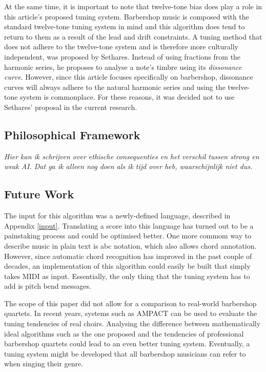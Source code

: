 \documentclass[a4paper]{article}
\begin{document}
At the same time, it is important to note that twelve-tone bias does play a role in this article's proposed tuning system. Barbershop music is composed with the standard twelve-tone tuning system in mind and this algorithm does tend to return to them as a result of the lead and drift constraints. A tuning method that does not adhere to the twelve-tone system and is therefore more culturally independent, was proposed by Sethares. Instead of using fractions from the harmonic series, he proposes to analyse a note's timbre using its \textit{dissonance curve}.\cite{sethares_adaptive_1994} However, since this article focuses specifically on barbershop, dissonance curves will always adhere to the natural harmonic series and using the twelve-tone system is commonplace. For these reasons, it was decided not to use Sethares' proposal in the current research.

\subsection{Philosophical Framework}
\textit{\color{red}Hier kan ik schrijven over ethische consequenties en het verschil tussen strong en weak AI. Dat ga ik alleen nog doen als ik tijd over heb, waarschijnlijk niet dus.}

\subsection{Future Work}
The input for this algorithm was a newly-defined language, described in Appendix \ref{input}. Translating a score into this language has turned out to be a painstaking process and could be optimised better. One more commom way to describe music in plain text is abc notation, which also allows chord annotation.\cite{walshaw_abc2mtex_1997} However, since automatic chord recognition has improved in the past couple of decades\cite{burgoyne_cross-validated_2007}, an implementation of this algorithm could easily be built that simply takes MIDI as input. Essentially, the only thing that the tuning system has to add is pitch bend messages.

The scope of this paper did not allow for a comparison to real-world barbershop quartets. In recent years, systems such as AMPACT can be used to evaluate the tuning tendencies of real choirs.\cite{devaney_study_2012} Analysing the difference between mathematically ideal algorithms such as the one proposed and the tendencies of professional barbershop quartets could lead to an even better tuning system. Eventually, a tuning system might be developed that all barbershop musicians can refer to when singing their genre.
\end{document}
